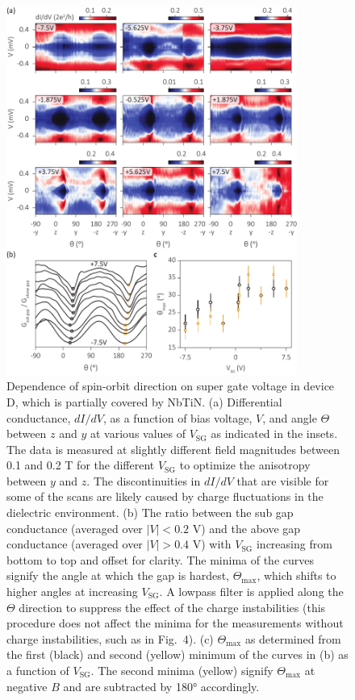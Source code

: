 \begin{figure}[p!]
\centering
\includegraphics[width=0.85\textwidth]{chapter_spinorbit/figures/SFig5_SGdep_half_updated.pdf}
\caption{\label{fig:SGdep}
Dependence of spin-orbit direction on super gate voltage in device D, which is partially covered by NbTiN.
(a) Differential conductance, $dI/dV$, as a function of bias voltage, $V$, and angle $\Theta$ between $z$ and $y$ at various values of $V_{\mathrm{SG}}$ as indicated in the insets.
The data is measured at slightly different field magnitudes between 0.1 and 0.2 T for the different $V_{\mathrm{SG}}$ to optimize the anisotropy between $y$ and $z$.
The discontinuities in $dI/dV$ that are visible for some of the scans are likely caused by charge fluctuations in the dielectric environment.
(b) The ratio between the sub gap conductance (averaged over $|V| < 0.2$ V) and the above gap conductance (averaged over $|V| > 0.4$ V) with $V_{\mathrm{SG}}$ increasing from bottom to top and offset for clarity.
The minima of the curves signify the angle at which the gap is hardest, $\Theta_{\mathrm{max}}$, which shifts to higher angles at increasing $V_{\mathrm{SG}}$.
A lowpass filter is applied along the $\Theta$ direction to suppress the effect of the charge instabilities (this procedure does not affect the minima for the measurements without charge instabilities, such as in Fig.~4).
(c) $\Theta_{\mathrm{max}}$ as determined from the first (black) and second (yellow) minimum of the curves in (b) as a function of $V_{\mathrm{SG}}$.
The second minima (yellow) signify $\Theta_{\mathrm{max}}$ at negative $B$ and are subtracted by \ang{180} accordingly.
}
\end{figure}

